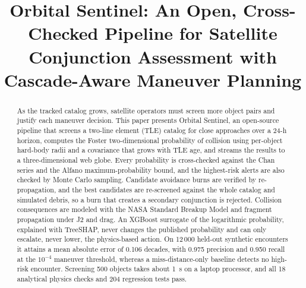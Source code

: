 \documentclass[conference]{IEEEtran}
\begin{document}
\title{Orbital Sentinel: An Open, Cross-Checked Pipeline for Satellite
Conjunction Assessment with Cascade-Aware Maneuver Planning}

\author{
}

\maketitle

\begin{abstract}
As the tracked catalog grows, satellite operators must screen more object
pairs and justify each maneuver decision. This paper presents Orbital Sentinel,
an open-source pipeline that screens a two-line element (TLE) catalog for close
approaches over a 24-h horizon, computes the Foster two-dimensional probability
of collision using per-object hard-body radii and a covariance that grows with
TLE age, and streams the results to a three-dimensional web globe. Every
probability is cross-checked against the Chan series and the Alfano
maximum-probability bound, and the highest-risk alerts are also checked by Monte
Carlo sampling. Candidate avoidance burns are verified by re-propagation, and the
best candidates are re-screened against the whole catalog and simulated debris,
so a burn that creates a secondary conjunction is rejected. Collision
consequences are modeled with the NASA Standard Breakup Model and fragment
propagation under J2 and drag. An XGBoost surrogate of the logarithmic
probability, explained with TreeSHAP, never changes the published probability
and can only escalate, never lower, the physics-based action. On 12\,000
held-out synthetic encounters it attains a mean absolute error of 0.106 decades,
with 0.975 precision and 0.950 recall at the $10^{-4}$ maneuver threshold,
whereas a miss-distance-only baseline detects no high-risk encounter. Screening
500 objects takes about 1~s on a laptop processor, and all 18 analytical physics
checks and 204 regression tests pass.
\end{abstract}
\end{document}
